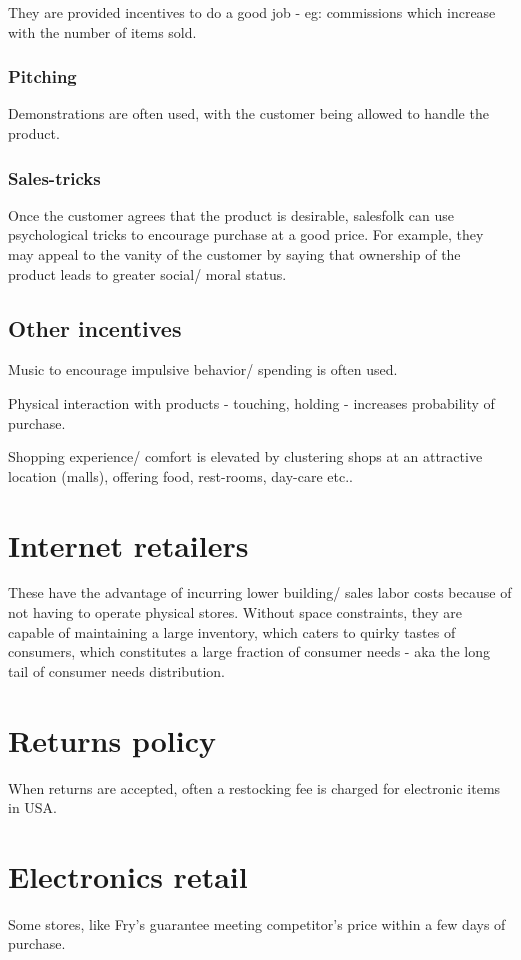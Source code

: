 \documentclass[oneside, article]{memoir}
\begin{document}
They are provided incentives to do a good job  - eg: commissions which increase with the number of items sold.

\subsubsection{Pitching}
Demonstrations are often used, with the customer being allowed to handle the product.

\subsubsection{Sales-tricks}
Once the customer agrees that the product is desirable, salesfolk can use psychological tricks to encourage purchase at a good price. For example, they may appeal to the vanity of the customer by saying that ownership of the product leads to greater social/ moral status.

\subsection{Other incentives}
Music to encourage impulsive behavior/ spending is often used.

Physical interaction with products - touching, holding - increases probability of purchase.

Shopping experience/ comfort is elevated by clustering shops at an attractive location (malls),  offering food, rest-rooms, day-care etc..

\section{Internet retailers}
These have the advantage of incurring lower building/ sales labor costs because of not having to operate physical stores. Without space constraints, they are capable of maintaining a large inventory, which caters to quirky tastes of consumers, which constitutes a large fraction of consumer needs - aka the long tail of consumer needs distribution.

\section{Returns policy}
When returns are accepted, often a restocking fee is charged for electronic items in USA.

\section{Electronics retail}
Some stores, like Fry's guarantee meeting competitor's price within a few days of purchase.
\end{document}

